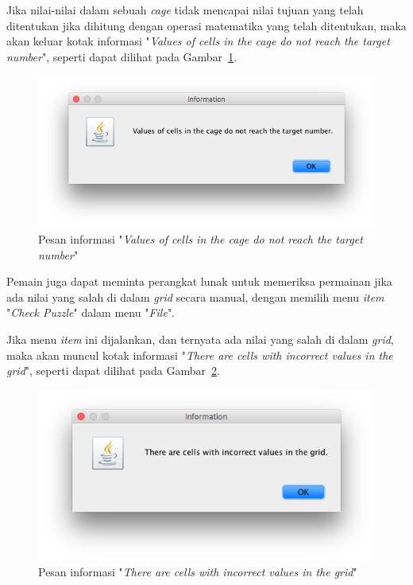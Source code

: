 \begin{enumerate}
Jika nilai-nilai dalam sebuah \textit{cage} tidak mencapai nilai tujuan yang telah ditentukan jika dihitung dengan operasi matematika yang telah ditentukan, maka akan keluar kotak informasi "\textit{Values of cells in the cage do not reach the target number}", seperti dapat dilihat pada Gambar~\ref{fig:cagedonotreachtargetnumber}.

\begin{figure}
\centering
\captionsetup{justification=centering}
\includegraphics[scale=0.5]{Gambar/ImplementasiPengujian/CageDoNotReachTargetNumber.png}
\caption[Pesan informasi "\textit{Values of cells in the cage do not reach the target number}"]{Pesan informasi "\textit{Values of cells in the cage do not reach the target number}"}
\label{fig:cagedonotreachtargetnumber}
\end{figure}

Pemain juga dapat meminta perangkat lunak untuk memeriksa permainan jika ada nilai yang salah di dalam \textit{grid} secara manual, dengan memilih menu \textit{item} "\textit{Check Puzzle}" dalam menu "\textit{File}".

Jika menu \textit{item} ini dijalankan, dan ternyata ada nilai yang salah di dalam \textit{grid}, maka akan muncul kotak informasi "\textit{There are cells with incorrect values in the grid}", seperti dapat dilihat pada Gambar~\ref{fig:incorrectvalues}.

\begin{figure}
\centering
\captionsetup{justification=centering}
\includegraphics[scale=0.5]{Gambar/ImplementasiPengujian/IncorrectValues.png}
\caption[Pesan informasi "\textit{There are cells with incorrect values in the grid}"]{Pesan informasi "\textit{There are cells with incorrect values in the grid}"}
\label{fig:incorrectvalues}
\end{figure}


\end{enumerate}
